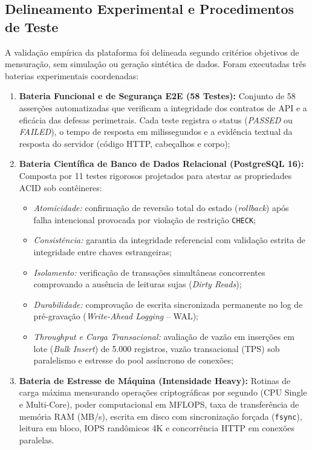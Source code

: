 \subsection{Delineamento Experimental e Procedimentos de Teste}
\label{sec:procedimentos-teste}

A validação empírica da plataforma foi delineada segundo critérios objetivos de mensuração, sem simulação ou geração sintética de dados. Foram executadas três baterias experimentais coordenadas:

\begin{enumerate}[label=(\roman*)]
    \item \textbf{Bateria Funcional e de Segurança E2E (58 Testes):} Conjunto de 58 asserções automatizadas que verificam a integridade dos contratos de API e a eficácia das defesas perimetrais. Cada teste registra o status (\textit{PASSED} ou \textit{FAILED}), o tempo de resposta em milissegundos e a evidência textual da resposta do servidor (código HTTP, cabeçalhos e corpo);
    \item \textbf{Bateria Científica de Banco de Dados Relacional (PostgreSQL 16):} Composta por 11 testes rigorosos projetados para atestar as propriedades ACID sob contêineres:
    \begin{itemize}
        \item \textit{Atomicidade:} confirmação de reversão total do estado (\textit{rollback}) após falha intencional provocada por violação de restrição \texttt{CHECK};
        \item \textit{Consistência:} garantia da integridade referencial com validação estrita de integridade entre chaves estrangeiras;
        \item \textit{Isolamento:} verificação de transações simultâneas concorrentes comprovando a ausência de leituras sujas (\textit{Dirty Reads});
        \item \textit{Durabilidade:} comprovação de escrita sincronizada permanente no log de pré-gravação (\textit{Write-Ahead Logging} -- WAL);
        \item \textit{Throughput e Carga Transacional:} avaliação de vazão em inserções em lote (\textit{Bulk Insert}) de 5.000 registros, vazão transacional (TPS) sob paralelismo e estresse do pool assíncrono de conexões;
    \end{itemize}
    \item \textbf{Bateria de Estresse de Máquina (Intensidade Heavy):} Rotinas de carga máxima mensurando operações criptográficas por segundo (CPU Single e Multi-Core), poder computacional em MFLOPS, taxa de transferência de memória RAM (MB/s), escrita em disco com sincronização forçada (\texttt{fsync}), leitura em bloco, IOPS randômicos 4K e concorrência HTTP em conexões paralelas.
\end{enumerate}

